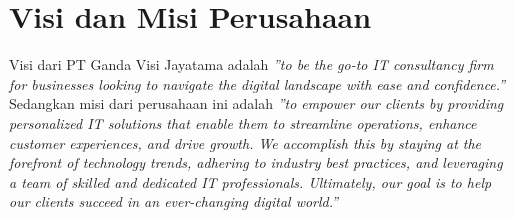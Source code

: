 
\section{Visi dan Misi Perusahaan}

Visi dari PT Ganda Visi Jayatama adalah \textit{”to be the go-to IT consultancy firm
for businesses looking to navigate the digital landscape with ease and confidence.”}
Sedangkan misi dari perusahaan ini adalah \textit{”to empower our clients by providing
personalized IT solutions that enable them to streamline operations, enhance
customer experiences, and drive growth. We accomplish this by staying at the
forefront of technology trends, adhering to industry best practices, and leveraging
a team of skilled and dedicated IT professionals. Ultimately, our goal is to help our
clients succeed in an ever-changing digital world.”}




